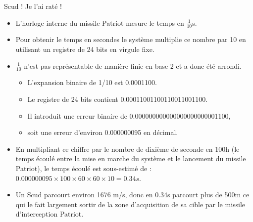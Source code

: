 \documentclass[10pt]{beamer}
\begin{document}
\begin{frame}{Scud ! Je l’ai raté !}
  \begin{itemize}
  \item L’horloge interne du missile Patriot mesure le temps en $\frac{1}{10}$s.
  \item Pour obtenir le temps en secondes le système multiplie ce   nombre par 10 en utilisant un registre de 24 bits en virgule fixe.
  \item $\frac{1}{10}$ n’est pas représentable de manière finie en base 2 et a donc été arrondi.
    \begin{itemize}
    \item L’expansion binaire de 1/10 est 0.0001100.
    \item Le registre de 24 bits contient 0.00011001100110011001100.
    \item Il introduit une erreur binaire de 0.000000000000000000000001100,
    \item soit une erreur d'environ 0.000000095 en décimal.
    \end{itemize}
  \item En multipliant ce chiffre par le nombre de dixième de seconde en 100h (le temps écoulé entre la mise en marche du système et le lancement du missile Patriot), le temps écoulé est sous-estimé de : \\$ 0.000000095 \times 100 \times 60 \times 60 \times 10 = 0.34s$.
  \item Un Scud parcourt environ 1676 m/s, donc en 0.34s parcourt plus de 500m ce qui le fait largement sortir de la zone d’acquisition de sa cible par le missile d’interception Patriot.
  \end{itemize}
\end{frame}







\end{document}
